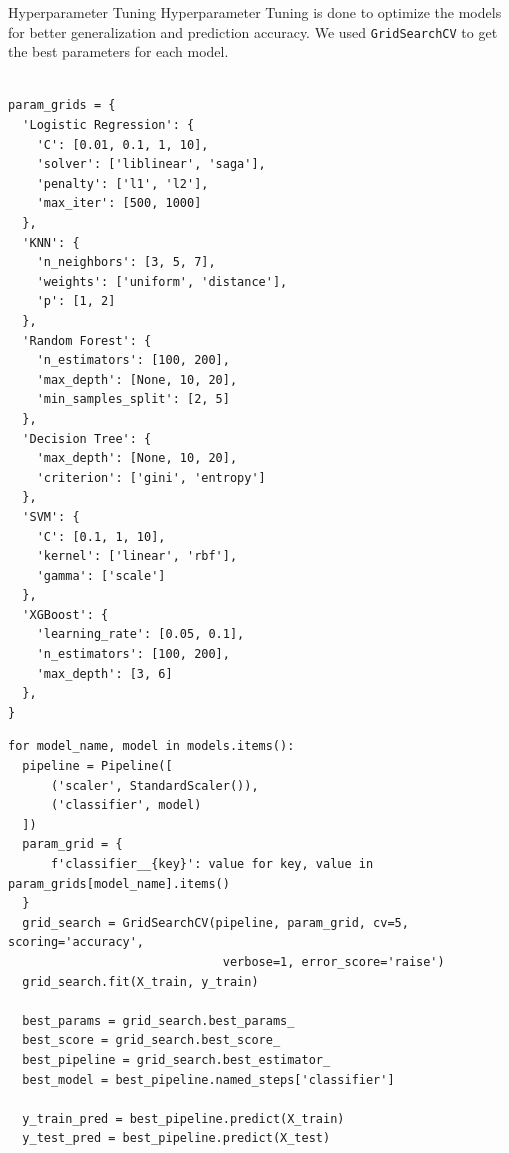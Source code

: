 \documentclass[14pt, aspectratio=169]{beamer}
\begin{document}
\begin{frame}{Hyperparameter Tuning}
Hyperparameter Tuning is done to optimize the models for better generalization and prediction accuracy. We used \texttt{GridSearchCV} to get the best parameters for each model. 
\scriptsize
\begin{multicols}{2}

\begin{verbatim}

param_grids = {
  'Logistic Regression': {
    'C': [0.01, 0.1, 1, 10],
    'solver': ['liblinear', 'saga'],
    'penalty': ['l1', 'l2'],
    'max_iter': [500, 1000]
  },
  'KNN': {
    'n_neighbors': [3, 5, 7],
    'weights': ['uniform', 'distance'],
    'p': [1, 2]
  },
  'Random Forest': {
    'n_estimators': [100, 200],
    'max_depth': [None, 10, 20],
    'min_samples_split': [2, 5]
  },
  'Decision Tree': {
    'max_depth': [None, 10, 20],
    'criterion': ['gini', 'entropy']
  },
  'SVM': {
    'C': [0.1, 1, 10],
    'kernel': ['linear', 'rbf'],
    'gamma': ['scale']
  },
  'XGBoost': {
    'learning_rate': [0.05, 0.1],
    'n_estimators': [100, 200],
    'max_depth': [3, 6]
  },
}
\end{verbatim}
\end{multicols}
\begin{verbatim}
for model_name, model in models.items():
  pipeline = Pipeline([
      ('scaler', StandardScaler()), 
      ('classifier', model)         
  ])
  param_grid = {
      f'classifier__{key}': value for key, value in param_grids[model_name].items()
  }
  grid_search = GridSearchCV(pipeline, param_grid, cv=5, scoring='accuracy', 
                              verbose=1, error_score='raise')  
  grid_search.fit(X_train, y_train) 

  best_params = grid_search.best_params_
  best_score = grid_search.best_score_
  best_pipeline = grid_search.best_estimator_
  best_model = best_pipeline.named_steps['classifier']

  y_train_pred = best_pipeline.predict(X_train)  
  y_test_pred = best_pipeline.predict(X_test)

\end{verbatim}


\end{frame}
\end{document}
